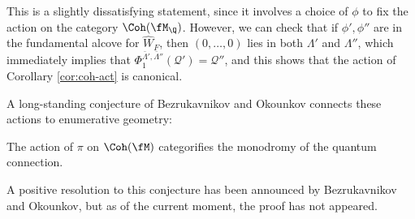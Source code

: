 This is a slightly dissatisfying statement, since it involves a choice of $\phi$ to fix the action on the category $\Coh(\fM_\Q)$. However, we can check that if $\phi',\phi''$ are in the fundamental alcove for $\widehat{W}_F$, then $(0,\dots, 0)$ lies in both $\Lambda'$ and $\Lambda''$, which immediately implies that  $\mathsf{\Phi}_1^{\bar{\Lambda}',\bar{\Lambda}''} (\mathcal{Q}')=\mathcal{Q}''$, and this shows that the action of Corollary \ref{cor:coh-act} is canonical.  

A long-standing conjecture of Bezrukavnikov and Okounkov connects these actions to enumerative geometry:
\begin{conjecture}\label{conj:BO}
The action of $\pi$ on $\Coh(\fM)$ categorifies the monodromy of the quantum connection.
\end{conjecture}
A positive resolution to this conjecture has been announced by Bezrukavnikov and Okounkov, but as of the current moment, the proof has not appeared.






